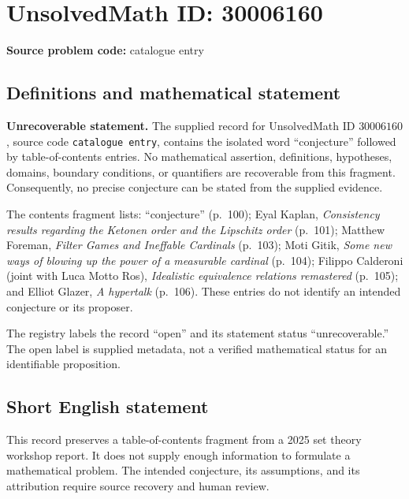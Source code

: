 \documentclass[11pt]{article}
\begin{document}
\section*{UnsolvedMath ID: 30006160}
\textbf{Source problem code:} catalogue entry
\subsection{Definitions and mathematical statement}
\textbf{Unrecoverable statement.} The supplied record for UnsolvedMath ID \(30006160\), source code \texttt{catalogue entry}, contains the isolated word ``conjecture'' followed by table-of-contents entries. No mathematical assertion, definitions, hypotheses, domains, boundary conditions, or quantifiers are recoverable from this fragment. Consequently, no precise conjecture can be stated from the supplied evidence.

The contents fragment lists: ``conjecture'' (p.~100); Eyal Kaplan, \emph{Consistency results regarding the Ketonen order and the Lipschitz order} (p.~101); Matthew Foreman, \emph{Filter Games and Ineffable Cardinals} (p.~103); Moti Gitik, \emph{Some new ways of blowing up the power of a measurable cardinal} (p.~104); Filippo Calderoni (joint with Luca Motto Ros), \emph{Idealistic equivalence relations remastered} (p.~105); and Elliot Glazer, \emph{A hypertalk} (p.~106). These entries do not identify an intended conjecture or its proposer.

The registry labels the record ``open'' and its statement status ``unrecoverable.'' The open label is supplied metadata, not a verified mathematical status for an identifiable proposition.
\subsection{Short English statement}
This record preserves a table-of-contents fragment from a 2025 set theory workshop report. It does not supply enough information to formulate a mathematical problem. The intended conjecture, its assumptions, and its attribution require source recovery and human review.
\end{document}
